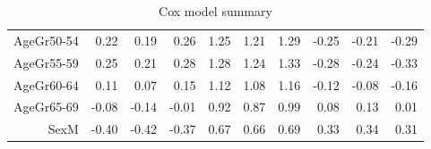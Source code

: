 \begin{table}[ht]
\begin{tabular}{rrrrrrrrrr}
  AgeGr50-54 & 0.22 & 0.19 & 0.26 & 1.25 & 1.21 & 1.29 & -0.25 & -0.21 & -0.29 \\ 
  AgeGr55-59 & 0.25 & 0.21 & 0.28 & 1.28 & 1.24 & 1.33 & -0.28 & -0.24 & -0.33 \\ 
  AgeGr60-64 & 0.11 & 0.07 & 0.15 & 1.12 & 1.08 & 1.16 & -0.12 & -0.08 & -0.16 \\ 
  AgeGr65-69 & -0.08 & -0.14 & -0.01 & 0.92 & 0.87 & 0.99 & 0.08 & 0.13 & 0.01 \\ 
  SexM & -0.40 & -0.42 & -0.37 & 0.67 & 0.66 & 0.69 & 0.33 & 0.34 & 0.31 \\ 
   \hline
\end{tabular}
\caption{Cox model summary} 
\end{table}
